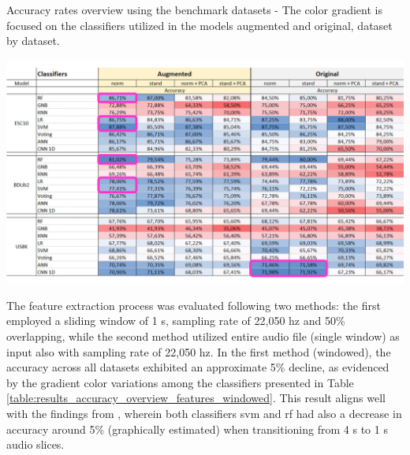 \begin{table}[ht!]
    \caption[Accuracy rates overview using the benchmark datasets - Models augmented x original (Focus on the classifiers dataset by dataset)]{Accuracy rates overview using the benchmark datasets - The color gradient is focused on the classifiers utilized in the models augmented and original, dataset by dataset.}
    \label{table:results_accuracy_overview_classifiers_aug_ori_2}
     \raggedright
    \includegraphics[width=1\textwidth]{resources/images/060-results/Results_classification_overview_aug_x_ori_2.png}
\end{table}

The feature extraction process was evaluated following two methods: the first employed a sliding window of 1 \gls{s}, sampling rate of 22,050 \gls{hz} and 50\% overlapping, while the second method utilized entire audio file (single window) as input also with sampling rate of 22,050 \gls{hz}. In the first method (windowed), the accuracy across all datasets exhibited an approximate 5\% decline, as evidenced by the gradient color variations among the classifiers presented in Table \ref{table:results_accuracy_overview_features_windowed}. This result aligns well with the findings from \textcite{Salamon2014}, wherein both classifiers \gls{svm} and \gls{rf} had also a decrease in accuracy around 5\% (graphically estimated) when transitioning from 4 \gls{s} to 1 \gls{s} audio slices. 

